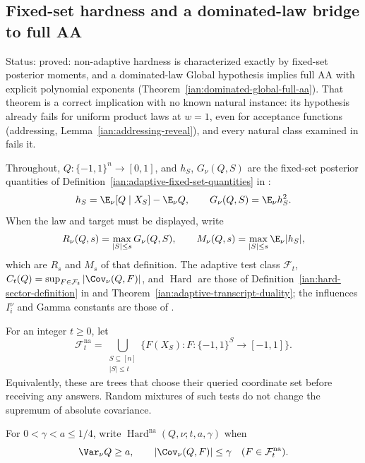 \subsection{Fixed-set hardness and a dominated-law bridge to full AA}\label{ian:gamma-hard-sector-bridge}

Status: proved: non-adaptive hardness is characterized exactly by fixed-set posterior moments, and a dominated-law Global hypothesis implies full AA with explicit polynomial exponents (Theorem~\ref{ian:dominated-global-full-aa}). That theorem is a correct implication with no known natural instance: its hypothesis already fails for uniform product laws at \(w=1\), even for acceptance functions (addressing, Lemma~\ref{ian:addressing-reveal}), and every natural class examined in  fails it.

Throughout, \(Q:\{-1,1\}^n\to[0,1]\), and \(h_S\), \(G_\nu(Q,S)\) are the fixed-set
posterior quantities of Definition~\ref{ian:adaptive-fixed-set-quantities} in
:
\[
 h_S=\E_\nu[Q\mid X_S]-\E_\nu Q,
 \qquad
 G_\nu(Q,S)=\E_\nu h_S^2.
\]
When the law and target must be displayed, write
\[
 R_\nu(Q,s)=\max_{|S|\le s}G_\nu(Q,S),
 \qquad
 M_\nu(Q,s)=\max_{|S|\le s}\E_\nu|h_S|,
\]
which are \(R_s\) and \(M_s\) of that definition. The adaptive test class
\(\mathcal F_t\), \(C_t(Q)=\sup_{F\in\mathcal F_t}|\Cov_\nu(Q,F)|\), and
\(\operatorname{Hard}\) are those of
Definition~\ref{ian:hard-sector-definition} in
 and
Theorem~\ref{ian:adaptive-transcript-duality}; the influences
\(I_i^\nu\) and Gamma constants are those of
.

\begin{definition}
\label{ian:nonadaptive-hardness-definition}
For an integer \(t\ge0\), let
\[
 \mathcal F_t^{\mathrm{na}}
 =
 \bigcup_{\substack{S\subseteq[n]\\|S|\le t}}
 \{F(X_S):F:\{-1,1\}^S\to[-1,1]\}.
\]
Equivalently, these are trees that choose their queried coordinate set
before receiving any answers. Random mixtures of such tests do not
change the supremum of absolute covariance.

For \(0<\gamma<a\le1/4\), write
\(\operatorname{Hard}^{\mathrm{na}}(Q,\nu;t,a,\gamma)\) when
\[
 \Var_\nu Q\ge a,
 \qquad
 |\Cov_\nu(Q,F)|\le\gamma
 \quad(F\in\mathcal F_t^{\mathrm{na}}).
\]
\end{definition}

